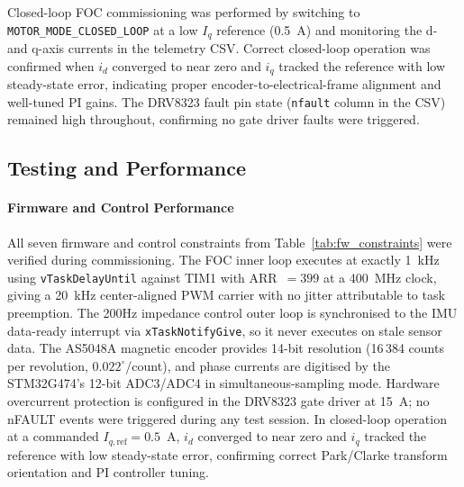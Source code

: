 \documentclass[11pt]{article}
\begin{document}
Closed-loop FOC commissioning was performed by switching to \texttt{MOTOR\_MODE\_CLOSED\_LOOP} at a low $I_q$ reference (0.5~A) and monitoring the d- and q-axis currents in the telemetry CSV. Correct closed-loop operation was confirmed when $i_d$ converged to near zero and $i_q$ tracked the reference with low steady-state error, indicating proper encoder-to-electrical-frame alignment and well-tuned PI gains. The DRV8323 fault pin state (\texttt{nfault} column in the CSV) remained high throughout, confirming no gate driver faults were triggered.


\subsection{Testing and Performance}

\paragraph{Firmware and Control Performance}

All seven firmware and control constraints from Table~\ref{tab:fw_constraints} were verified during commissioning. The FOC inner loop executes at exactly 1~kHz using \texttt{vTaskDelayUntil} against TIM1 with ARR~$= 399$ at a 400~MHz clock, giving a 20~kHz center-aligned PWM carrier with no jitter attributable to task preemption. The 200Hz impedance control outer loop is synchronised to the IMU data-ready interrupt via \texttt{xTaskNotifyGive}, so it never executes on stale sensor data. The AS5048A magnetic encoder provides 14-bit resolution (16\,384 counts per revolution, $0.022^\circ$/count), and phase currents are digitised by the STM32G474's 12-bit ADC3/ADC4 in simultaneous-sampling mode. Hardware overcurrent protection is configured in the DRV8323 gate driver at 15~A; no nFAULT events were triggered during any test session. In closed-loop operation at a commanded $I_{q,\text{ref}} = 0.5$~A, $i_d$ converged to near zero and $i_q$ tracked the reference with low steady-state error, confirming correct Park/Clarke transform orientation and PI controller tuning.
\vspace{10px}
\end{document}
